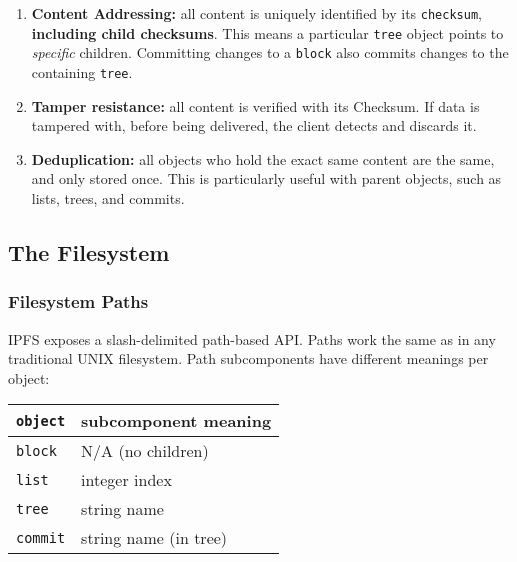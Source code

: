 \documentclass{sig-alternate}
\begin{document}
\begin{enumerate}
  \item \textbf{Content Addressing:} all content is uniquely identified by its
        \texttt{checksum}, \textbf{including child checksums}. This means a
        particular \texttt{tree} object points to \textit{specific} children.
        Committing changes to a \texttt{block} also commits changes to the
        containing \texttt{tree}.
  \item \textbf{Tamper resistance:} all content is verified with its Checksum.
        If data is tampered with, before being delivered, the client
        detects and discards it.
  \item \textbf{Deduplication:} all objects who hold the exact same content
        are the same, and only stored once. This is particularly useful with
        parent objects, such as lists, trees, and commits.
\end{enumerate}


\subsection{The Filesystem}

\subsubsection{Filesystem Paths}

IPFS exposes a slash-delimited path-based API. Paths work the same as in any
traditional UNIX filesystem. Path subcomponents have different meanings per
object:

\begin{center}
\begin{tabular}{ll}
  \texttt{object} & subcomponent meaning \\
  \hline
  \hline
  \texttt{block}  & N/A (no children) \\
  \texttt{list}   & integer index \\
  \texttt{tree}   & string name \\
  \texttt{commit} & string name (in tree) \\
\end{tabular}
\end{center}
\end{document}
